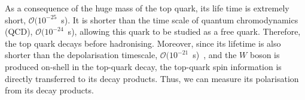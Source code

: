 As a consequence of the huge mass of the top quark, its life time is extremely short, $\mathcal{O}(10^{-25}$~s). It is shorter than the time scale of quantum chromodynamics (QCD), $\mathcal{O}(10^{-24}$~s), allowing this quark to be studied as a free quark. Therefore, the top quark decays before hadronising. Moreover, since its lifetime is also shorter than the depolarisation timescale, $\mathcal{O}(10^{-21}$~s)~\cite{Bigi:1986jk}, and the $W$ boson is produced on-shell in the top-quark decay, the top-quark spin information is directly transferred to its decay products. Thus, we can measure its polarisation from its decay products.


